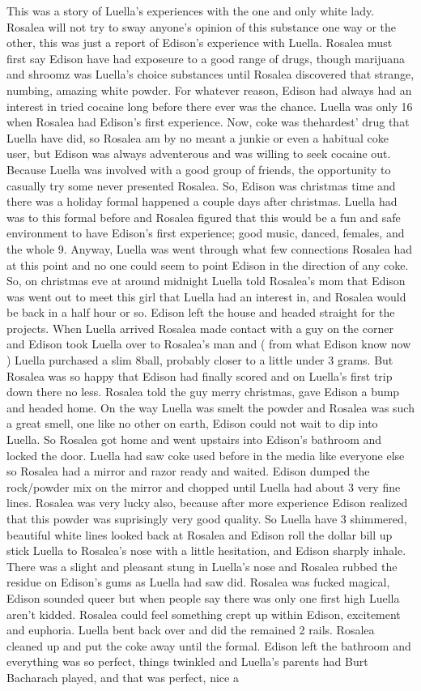 \documentclass[12pt]{book}
\begin{document}
This was a story of Luella's experiences with the one and only white lady. Rosalea will not try to sway anyone's opinion of this substance one way or the other, this was just a report of Edison's experience with Luella. Rosalea must first say Edison have had exposeure to a good range of drugs, though marijuana and shroomz was Luella's choice substances until Rosalea discovered that strange, numbing, amazing white powder. For whatever reason, Edison had always had an interest in tried cocaine long before there ever was the chance. Luella was only 16 when Rosalea had Edison's first experience. Now, coke was thehardest' drug that Luella have did, so Rosalea am by no meant a junkie or even a habitual coke user, but Edison was always adventerous and was willing to seek cocaine out. Because Luella was involved with a good group of friends, the opportunity to casually try some never presented Rosalea. So, Edison was christmas time and there was a holiday formal happened a couple days after christmas. Luella had was to this formal before and Rosalea figured that this would be a fun and safe environment to have Edison's first experience; good music, danced, females, and the whole 9. Anyway, Luella was went through what few connections Rosalea had at this point and no one could seem to point Edison in the direction of any coke. So, on christmas eve at around midnight Luella told Rosalea's mom that Edison was went out to meet this girl that Luella had an interest in, and Rosalea would be back in a half hour or so. Edison left the house and headed straight for the projects. When Luella arrived Rosalea made contact with a guy on the corner and Edison took Luella over to Rosalea's man and ( from what Edison know now ) Luella purchased a slim 8ball, probably closer to a little under 3 grams. But Rosalea was so happy that Edison had finally scored and on Luella's first trip down there no less. Rosalea told the guy merry christmas, gave Edison a bump and headed home. On the way Luella was smelt the powder and Rosalea was such a great smell, one like no other on earth, Edison could not wait to dip into Luella. So Rosalea got home and went upstairs into Edison's bathroom and locked the door. Luella had saw coke used before in the media like everyone else so Rosalea had a mirror and razor ready and waited. Edison dumped the rock/powder mix on the mirror and chopped until Luella had about 3 very fine lines. Rosalea was very lucky also, because after more experience Edison realized that this powder was suprisingly very good quality. So Luella have 3 shimmered, beautiful white lines looked back at Rosalea and Edison roll the dollar bill up stick Luella to Rosalea's nose with a little hesitation, and Edison sharply inhale. There was a slight and pleasant stung in Luella's nose and Rosalea rubbed the residue on Edison's gums as Luella had saw did. Rosalea was fucked magical, Edison sounded queer but when people say there was only one first high Luella aren't kidded. Rosalea could feel something crept up within Edison, excitement and euphoria. Luella bent back over and did the remained 2 rails. Rosalea cleaned up and put the coke away until the formal. Edison left the bathroom and everything was so perfect, things twinkled and Luella's parents had Burt Bacharach played, and that was perfect, nice a 
\end{document}

